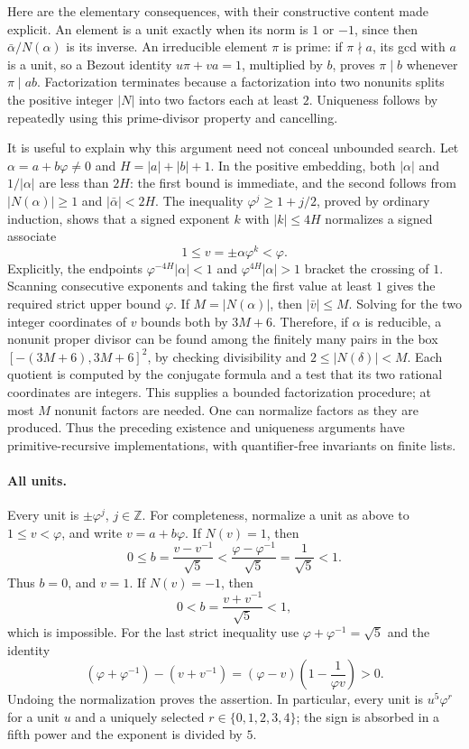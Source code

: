 Here are the elementary consequences, with their constructive content
made explicit.  An element is a unit exactly when its norm is \(1\) or
\(-1\), since then \(\bar\alpha/N(\alpha)\) is its inverse.  An irreducible
element \(\pi\) is prime: if \(\pi\nmid a\), its gcd with \(a\) is a unit,
so a Bezout identity \(u\pi+va=1\), multiplied by \(b\), proves
\(\pi\mid b\) whenever \(\pi\mid ab\).  Factorization terminates because
a factorization into two nonunits splits the positive integer \(|N|\)
into two factors each at least \(2\).  Uniqueness follows by repeatedly
using this prime-divisor property and cancelling.

It is useful to explain why this argument need not conceal unbounded
search.  Let \(\alpha=a+b\varphi\ne0\) and
\(H=|a|+|b|+1\).  In the positive embedding, both
\(|\alpha|\) and \(1/|\alpha|\) are less than \(2H\): the first
bound is immediate, and the second follows from
\(|N(\alpha)|\ge1\) and \(|\bar\alpha|<2H\).
The inequality
\(\varphi^j\ge1+j/2\), proved by ordinary induction, shows that a
signed exponent \(k\) with \(|k|\le4H\) normalizes a signed associate
\[
 1\le v=\pm\alpha\varphi^k<\varphi.
\]
Explicitly, the endpoints \(\varphi^{-4H}|\alpha|<1\) and
\(\varphi^{4H}|\alpha|>1\) bracket the crossing of \(1\).
Scanning consecutive exponents and taking the first value at least \(1\)
gives the required strict upper bound \(\varphi\).
If \(M=|N(\alpha)|\), then \(|\bar v|\le M\).  Solving for the two
integer coordinates of \(v\) bounds both by \(3M+6\).
Therefore, if \(\alpha\) is reducible, a nonunit proper divisor can be
found among the finitely many pairs in the box
\([-(3M+6),3M+6]^2\), by checking divisibility and
\(2\le |N(\delta)|<M\).
Each quotient is computed by the conjugate formula and a test that its
two rational coordinates are integers.  This supplies a bounded
factorization procedure; at most \(M\) nonunit factors are needed.
One can normalize factors as they are produced.  Thus the preceding
existence and uniqueness arguments have primitive-recursive
implementations, with quantifier-free invariants on finite lists.

\paragraph{All units.}
Every unit is \(\pm\varphi^j\), \(j\in\mathbb Z\).
For completeness, normalize a unit as above to \(1\le v<\varphi\),
and write \(v=a+b\varphi\).  If \(N(v)=1\), then
\[
 0\le b=\frac{v-v^{-1}}{\sqrt5}
 <\frac{\varphi-\varphi^{-1}}{\sqrt5}
 =\frac1{\sqrt5}<1.
\]
Thus \(b=0\), and \(v=1\).  If \(N(v)=-1\), then
\[
 0<b=\frac{v+v^{-1}}{\sqrt5}<1,
\]
which is impossible.  For the last strict inequality use
\(\varphi+\varphi^{-1}=\sqrt5\) and the identity
\[
 (\varphi+\varphi^{-1})-(v+v^{-1})
   =(\varphi-v)\left(1-\frac1{\varphi v}\right)>0.
\]
Undoing the normalization proves the assertion.
In particular, every unit is \(u^5\varphi^r\) for a unit \(u\)
and a uniquely selected \(r\in\{0,1,2,3,4\}\);
the sign is absorbed in a fifth power and the exponent is divided by \(5\).

